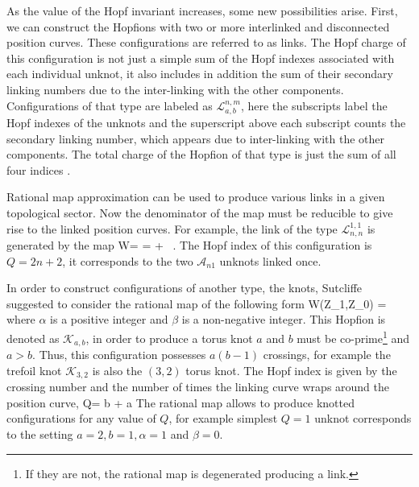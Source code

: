 \documentclass[12pt,a4paper]{article}
\begin{document}
As the value of the Hopf invariant increases, some new possibilities arise. First, we can construct
the Hopfions with  two or more interlinked and disconnected position curves.
These configurations are referred to as links. The Hopf charge of this configuration is not just
a simple sum of the Hopf indexes associated with each individual unknot, it also includes in addition the sum of their secondary
linking numbers due to the inter-linking with the other components.
Configurations of that type are labeled as
$\mathcal{L}_{a,b}^{n,m}$, here the subscripts label the Hopf indexes of the unknots
and the superscript above each subscript counts the secondary linking number, which appears due to
inter-linking with the other components. The total charge of the Hopfion of that type is just the sum of all four indices
\cite{Sutcliffe:2007ui}.

Rational map approximation 
can be used to produce various links in a given topological sector.
Now the denominator of the map
must be reducible to give rise to the linked position curves. For example,
the link of the type $\mathcal{L}_{n,n}^{1,1}$ is generated by the map
\be
W= = + \, .
\label{map-link}
\ee
The Hopf index of this configuration is $Q=2n+2$, it corresponds to the two $\mathcal{A}_{n1}$ unknots linked
once.

In order to construct configurations of another type, the knots,
Sutcliffe suggested to consider the rational map of the following form \cite{Sutcliffe:2007ui}
\be
W(Z_1,Z_0) =
\label{rational-Hopf-3}
\ee
where $\alpha$ is a positive integer and $\beta$ is a non-negative integer. This Hopfion is denoted as $\mathcal{K}_{a,b}$,
in order to produce
a torus knot $a$ and $b$ must be co-prime\footnote{If they are not, the rational map 
is degenerated producing a link.}
and $a>b$. Thus, this configuration possesses $a(b-1)$ crossings, for example the trefoil knot
$\mathcal{K}_{3,2}$ is also the $(3,2)$ torus knot. The Hopf index is given by the crossing number and the number of
times the linking curve wraps around the position curve,
\be
Q= \alpha b + \beta a
\ee
The rational map  allows to produce knotted configurations for any value of $Q$, for example simplest $Q=1$
unknot corresponds to the setting $a=2,b=1,\alpha=1$ and $\beta=0$.
\end{document}
